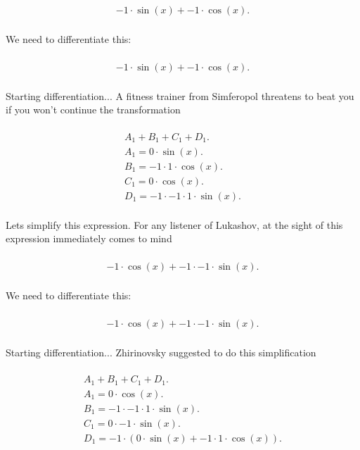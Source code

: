 \documentclass[12pt,a4paper]{extreport}
\begin{document}
\begin{multline}
\\
-1 \cdot \sin(x) + -1 \cdot \cos(x).\\
\end{multline}


We need to differentiate this:


\begin{multline}
\\
-1 \cdot \sin(x) + -1 \cdot \cos(x).\\
\end{multline}


Starting differentiation... 
A fitness trainer from Simferopol\cite{SJ} threatens to beat you if you won't continue the transformation 

\begin{multline}
\\
A_{1} + B_{1} + C_{1} + D_{1}.\\
A_{1} = 0 \cdot \sin(x).\\
B_{1} = -1 \cdot 1 \cdot \cos(x).\\
C_{1} = 0 \cdot \cos(x).\\
D_{1} = -1 \cdot -1 \cdot 1 \cdot \sin(x).\\
\end{multline}


Lets simplify this expression.
For any listener of Lukashov, at the sight of this expression immediately comes to mind 

\begin{multline}
\\
-1 \cdot \cos(x) + -1 \cdot -1 \cdot \sin(x).\\
\end{multline}


We need to differentiate this:


\begin{multline}
\\
-1 \cdot \cos(x) + -1 \cdot -1 \cdot \sin(x).\\
\end{multline}


Starting differentiation... 
Zhirinovsky suggested \cite{Zhirinovsky} to do this simplification 

\begin{multline}
\\
A_{1} + B_{1} + C_{1} + D_{1}.\\
A_{1} = 0 \cdot \cos(x).\\
B_{1} = -1 \cdot -1 \cdot 1 \cdot \sin(x).\\
C_{1} = 0 \cdot -1 \cdot \sin(x).\\
D_{1} = -1 \cdot (0 \cdot \sin(x) + -1 \cdot 1 \cdot \cos(x)).\\
\end{multline}
\end{document}
